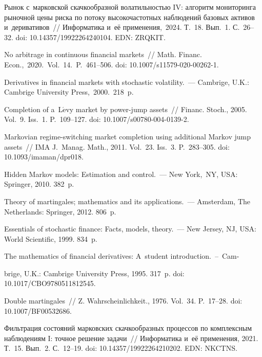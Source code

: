 \begin{multicols}{2}
{{\begin{thebibliography}{99}
 Рынок с~марковской скачкообразной волатильностью IV: алгоритм мониторинга рыночной цены риска 
по потоку высокочастотных наблюдений базовых активов и~деривативов~// Информатика и~её применения,~2024. 
Т.~18. Вып.~1. С.~26--32. doi: 10.14357/19922264240104. EDN: ZRQKIT.

 No arbitrage in continuous financial markets~//
Math. Financ. Econ.,~2020.~Vol.~14.~P.~461--506.
doi: 10.1007/s11579-020-00262-1.

Derivatives in financial markets with stochastic volatility.~--- Cambrige, U.K.: Cambrige University Press,~2000.~218~p.

 Completion of a~L$\acute{\mbox{e}}$vy market by power-jump assets~// Financ. 
Stoch., 2005. Vol.~9. Iss.~1. P.~109--127. doi: 10.1007/s00780-004-0139-2.

Markovian regime-switching market completion using additional Markov
  jump assets~//
IMA J.~Manag. Math., 2011. Vol.~23. Iss.~3. P.~283--305.
doi: 10.1093/imaman/dpr018.


 Hidden Markov models: Estimation and control.~--- New York,~NY, USA: Springer, 2010. 382~p.

Theory of martingales; mathematics and its applications.~--- Amsterdam, The Netherlands:   Springer, 2012. 806~p.

 Essentials of stochastic finance: Facts, models, theory.~--- New Jersey, NJ, USA: World Scientific, 1999. 834~p.

The mathematics of financial derivatives: A~student introduction.~--~Cam-\linebreak\vspace*{-12pt}

\pagebreak

\noindent
brige, U.K.:   Cambrige University Press, 1995. 317~p.
 doi: 10.1017/CBO9780511812545.
 

Double martingales~// Z. Wahrscheinlichkeit., 1976. Vol.~34. P.~17--28. doi: 10.1007/BF00532686.

\columnbreak

 Фильтрация состояний марковских скачкообразных процессов по комплексным наблюдениям I: точное решение задачи~// 
Информатика и~её применения, 2021. Т.~15. Вып.~2. С.~12--19. doi: 10.14357/19922264210202. EDN: NKCTNS.

\end{thebibliography}

 }
 }

\end{multicols}

